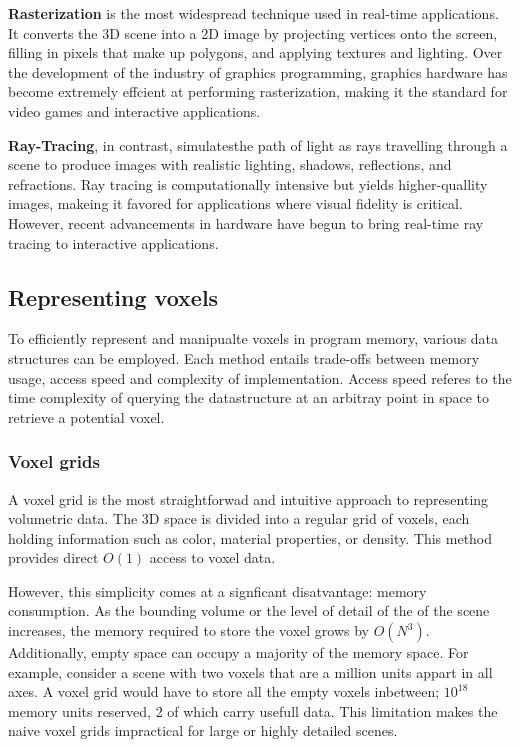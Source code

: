 \textbf{Rasterization} is the most widespread technique  used in real-time applications.
It converts the 3D scene into a 2D image by projecting vertices onto the screen, filling in pixels that make up polygons, and applying textures and lighting.
Over the development of the industry of graphics programming, graphics hardware has become extremely effcient at performing rasterization, making it the standard for video games and interactive applications.

\textbf{Ray-Tracing}, in contrast, simulatesthe path of light as rays travelling through a scene to produce images with realistic lighting, shadows, reflections, and refractions. Ray tracing is computationally intensive but yields higher-quallity images, makeing it favored for applications where visual fidelity is critical. However, recent advancements in hardware have begun to bring real-time ray tracing to interactive applications.

\subsection{Representing voxels}
To efficiently represent and manipualte voxels in program memory, various data structures can be employed. Each method entails trade-offs between memory usage, access speed and complexity of implementation. Access speed referes to the time complexity of querying the datastructure at an arbitray point in space to retrieve a potential voxel.

\subsubsection{Voxel grids}
A voxel grid is the most straightforwad and intuitive approach to representing volumetric data. The 3D space is divided into a regular grid of voxels, each holding information such as color, material properties, or density. This method provides direct $O(1)$ access to voxel data.

However, this simplicity comes at a signficant disatvantage: memory consumption.
As the bounding volume or the level of detail of the of the scene increases, the memory required to store the voxel grows by $O(N^{3})$.
Additionally, empty space can occupy a majority of the memory space.
For example, consider a scene with two voxels that are a million units appart in all axes.
A voxel grid would have to store all the empty voxels inbetween; $10^{18}$ memory units reserved, 2 of which carry usefull data.
This limitation makes the naive voxel grids impractical for large or highly detailed scenes.

